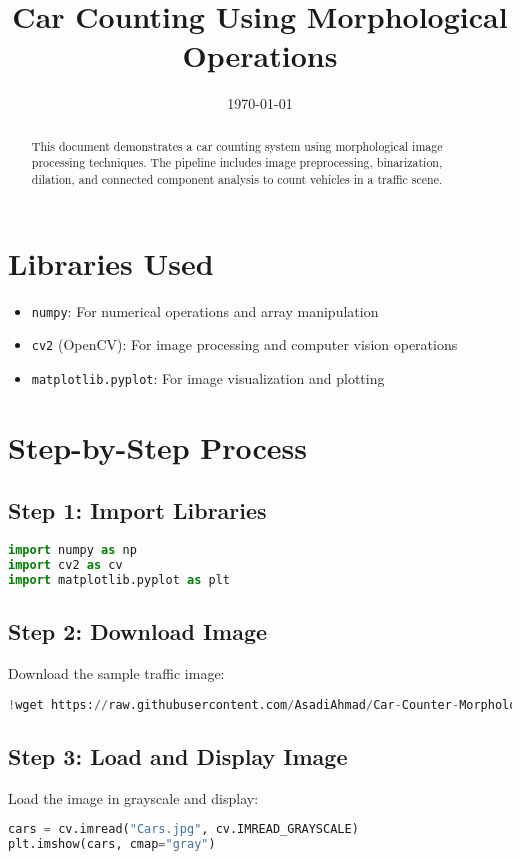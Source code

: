 \documentclass[12pt]{article}
\title{Car Counting Using Morphological Operations}
\date{\today}
\begin{document}
\maketitle

\begin{abstract}
This document demonstrates a car counting system using morphological image processing techniques. The pipeline includes image preprocessing, binarization, dilation, and connected component analysis to count vehicles in a traffic scene.
\end{abstract}

\section{Libraries Used}
\begin{itemize}
    \item \texttt{numpy}: For numerical operations and array manipulation
    \item \texttt{cv2} (OpenCV): For image processing and computer vision operations
    \item \texttt{matplotlib.pyplot}: For image visualization and plotting
\end{itemize}

\section{Step-by-Step Process}

\subsection{Step 1: Import Libraries}
\begin{lstlisting}[language=Python]
import numpy as np
import cv2 as cv
import matplotlib.pyplot as plt
\end{lstlisting}

\subsection{Step 2: Download Image}
Download the sample traffic image:
\begin{lstlisting}[language=Python]
!wget https://raw.githubusercontent.com/AsadiAhmad/Car-Counter-Morphology/main/Pictures/Cars.jpg -O Cars.jpg
\end{lstlisting}

\subsection{Step 3: Load and Display Image}
Load the image in grayscale and display:
\begin{lstlisting}[language=Python]
cars = cv.imread("Cars.jpg", cv.IMREAD_GRAYSCALE)
plt.imshow(cars, cmap="gray")
\end{lstlisting}
\end{document}
